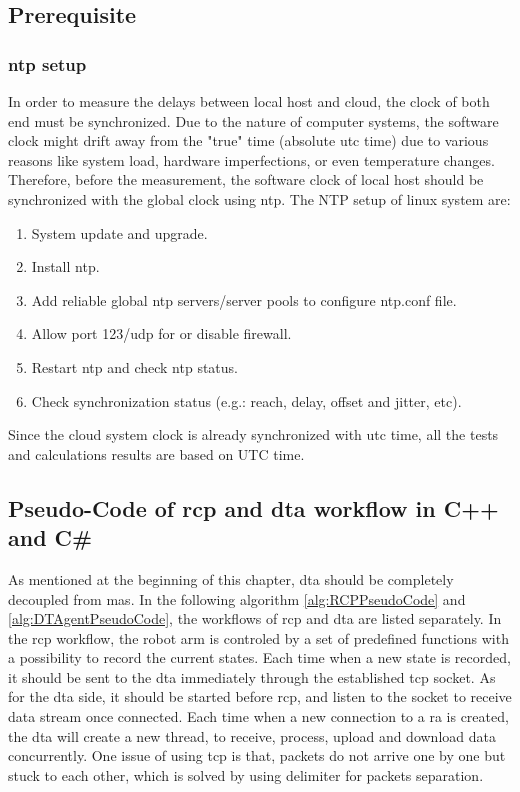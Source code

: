 \subsection{Prerequisite} \label{chap: ntpsetup}
\subsubsection{\gls{ntp} setup}
In order to measure the delays between local host and cloud, the clock of both end must be synchronized. 
Due to the nature of computer systems, the software clock might drift away from the "true" time (absolute \gls{utc} time) due to various reasons like system load, hardware imperfections, or even temperature changes.
Therefore, before the measurement, the software clock of local host should be synchronized with the global clock using \gls{ntp}. 
The NTP setup of linux system are:  

\begin{enumerate}
    \item System update and upgrade.
    \item Install \gls{ntp}.
    \item Add reliable global \gls{ntp} servers/server pools to configure ntp.conf file.
    \item Allow port 123/udp for or disable firewall.
    \item Restart \gls{ntp} and check \gls{ntp} status.
    \item Check synchronization status (e.g.: reach, delay, offset and jitter, etc).
    \end{enumerate}

Since the cloud system clock is already synchronized with \gls{utc} time, all the tests and calculations results are based on UTC time. 

\subsection{Pseudo-Code of \gls{rcp} and \gls{dta} workflow in C++ and C\#}\label{chap: RCPDTAPseudo}

As mentioned at the beginning of this chapter, \gls{dta} should be completely decoupled from \gls{mas}. 
In the following algorithm \ref{alg:RCPPseudoCode} and \ref{alg:DTAgentPseudoCode}, the workflows of \gls{rcp} and \gls{dta} are listed separately.
In the \gls{rcp} workflow, the robot arm is controled by a set of predefined functions with a possibility to record the current states. 
Each time when a new state is recorded, it should be sent to the \gls{dta} immediately through the established \gls{tcp} socket.
As for the \gls{dta} side, it should be started before \gls{rcp}, and listen to the socket to receive data stream once connected.
Each time when a new connection to a \gls{ra} is created, the \gls{dta} will create a new thread, to receive, process, upload and download data concurrently.
One issue of using \gls{tcp} is that, packets do not arrive one by one but stuck to each other, which is solved by using delimiter for packets separation.  



